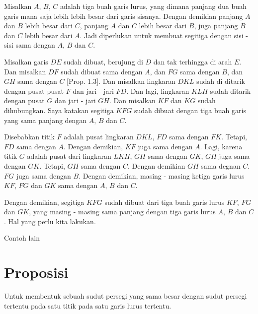 \documentclass[a4paper]{book}
\begin{document}
Misalkan $A$, $B$, $C$ adalah tiga buah garis lurus, yang dimana panjang
dua buah garis mana saja lebih lebih besar dari garis sisanya. Dengan demikian
panjang $A$ dan $B$ lebih besar dari $C$, panjang $A$ dan $C$ lebih besar dari
$B$, juga panjang $B$ dan $C$ lebih besar dari $A$. Jadi diperlukan untuk
membuat segitiga dengan sisi - sisi sama dengan $A$, $B$ dan $C$.

Misalkan garis $DE$ sudah dibuat, berujung di $D$ dan tak terhingga di arah $E$.
Dan misalkan $DF$ sudah dibuat sama dengan $A$, dan $FG$ sama dengan $B$, dan 
$GH$ sama dengan $C$ [Prop. 1.3]. Dan misalkan lingkaran $DKL$ sudah di ditarik
dengan pusat pusat $F$ dan jari - jari $FD$. Dan lagi, lingkaran $KLH$ sudah
ditarik dengan pusat $G$ dan jari - jari $GH$. Dan misalkan $KF$ dan $KG$ sudah
dihubungkan. Saya katakan segitiga $KFG$ sudah dibuat dengan tiga buah
garis yang sama panjang dengan $A$, $B$ dan $C$.

Disebabkan titik $F$ adalah pusat lingkaran $DKL$, $FD$ sama dengan $FK$. 
Tetapi, $FD$ sama dengan $A$. Dengan demikian, $KF$ juga sama dengan $A$. Lagi, 
karena titik $G$ adalah pusat dari lingkaran $LKH$, $GH$ sama dengan $GK$, $GH$
juga sama dengan $GK$. Tetapi, $GH$ sama dengan $C$. Dengan demikian $GH$ sama
degnan $C$. $FG$ juga sama dengan $B$. Dengan demikian, masing - masing 
ketiga garis lurus $KF$, $FG$ dan $GK$ sama dengan  $A$, $B$ dan $C$.

Dengan demikian, segitiga $KFG$ sudah dibuat dari tiga buah garis lurus $KF$, 
$FG$ dan $GK$, yang masing - masing sama panjang dengan tiga garis lurus 
$A$, $B$ dan $C$. Hal yang perlu kita lakukan.


Contoh lain

\begin{center}
\end{center}


\section*{\centering Proposisi \thesection}
Untuk membentuk sebuah sudut persegi yang sama besar dengan sudut 
persegi tertentu pada satu titik pada satu garis lurus tertentu.
\end{document}
